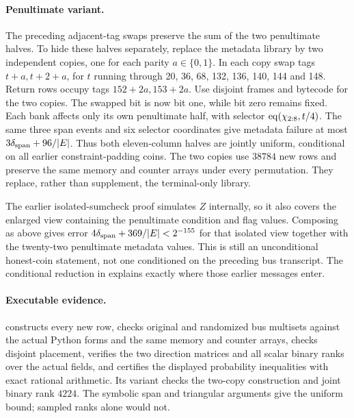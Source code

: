\paragraph{Penultimate variant.} The preceding adjacent-tag swaps preserve the sum of the two penultimate halves. To hide these halves separately, replace the metadata library by two independent copies, one for each parity $a\in\{0,1\}$. In each copy swap tags $t+a,t+2+a$, for $t$ running through 20, 36, 68, 132, 136, 140, 144 and 148. Return rows occupy tags $152+2a,153+2a$. Use disjoint frames and bytecode for the two copies. The swapped bit is now bit one, while bit zero remains fixed. Each bank affects only its own penultimate half, with selector $\operatorname{eq}(\chi_{2:8},t/4)$. The same three span events and six selector coordinates give metadata failure at most $3\delta_{\mathrm{span}}+96/|E|$. Thus both eleven-column halves are jointly uniform, conditional on all earlier constraint-padding coins. The two copies use $38784$ new rows and preserve the same memory and counter arrays under every permutation. They replace, rather than supplement, the terminal-only library.

The earlier isolated-sumcheck proof simulates $Z$ internally, so it also covers the enlarged view containing the penultimate condition and flag values. Composing as above gives error $4\delta_{\mathrm{span}}+369/|E|<2^{-155}$ for that isolated view together with the twenty-two penultimate metadata values. This is still an unconditional honest-coin statement, not one conditioned on the preceding bus transcript. The conditional reduction in  explains exactly where those earlier messages enter.

\paragraph{Executable evidence.}  constructs every new row, checks original and randomized bus multisets against the actual Python forms and the same memory and counter arrays, checks disjoint placement, verifies the two direction matrices and all scalar binary ranks over the actual fields, and certifies the displayed probability inequalities with exact rational arithmetic. Its  variant checks the two-copy construction and joint binary rank $4224$. The symbolic span and triangular arguments give the uniform bound; sampled ranks alone would not.
